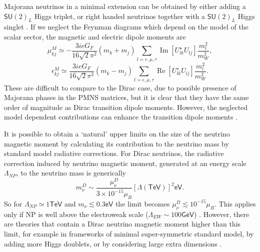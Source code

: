 Majorana neutrinos in a minimal extension can be obtained by either adding a $\textsf{SU}\left(2\right)_L$ Higgs triplet, or right handed neutrinos together with a $\textsf{SU}\left(2\right)_L$ Higgs singlet \cite{nuElmagInt2015.pdf}. If we neglect the Feynman diagrams which depend on the model of the scalar sector, the magnetic and electric dipole moments are
\begin{equation}
\mu_{kj}^M\simeq -\frac{3ieG_F}{16\sqrt{2}\pi^2}\left(m_k+m_j\right)\sum_{l=e,\mu ,\tau}\operatorname{Im}\left[U^{\star}_{lk}U_{lj}\right]\frac{m_l^2}{m_W^2},
\end{equation}
\begin{equation}
\epsilon_{kj}^M\simeq \frac{3ieG_F}{16\sqrt{2}\pi^2}\left(m_k-m_j\right)\sum_{l=e,\mu ,\tau}\operatorname{Re}\left[U^{\star}_{lk}U_{lj}\right]\frac{m_l^2}{m_W^2}.
\end{equation}
These are difficult to compare to the Dirac case, due to possible presence of Majorana phases in the \gls{PMNS} matrices, but it is clear that they have the same order of magnitude as Dirac transition dipole moments. However, the neglected model dependent contributions can enhance the transition dipole moments \cite{nuElmagInt2015.pdf}.

It is possible \cite{nuMMMajoranaBounds2006.pdf} to obtain a `natural' upper limits on the size of the neutrino magnetic moment by calculating its contribution to the neutrino mass by standard model radiative corrections.  For Dirac neutrinos, the radiative correction induced by neutrino magnetic moment, generated at an energy scale $\Lambda_{NP}$, to the neutrino mass is generically
\begin{equation}
m_{\nu}^D\sim\frac{\mu_{\nu}^D}{3\times 10^{-15}\mu_B}\left[\Lambda\left(\textsf{TeV}\right)\right]^2\textsf{eV}.
\end{equation}
So for $\Lambda_{NP}\simeq 1\textsf{TeV}$ and $m_{\nu}\lesssim 0.3\textsf{eV}$ the limit becomes $\mu_{\nu}^D\lesssim 10^{-15}\mu_B$. This applies only if \gls{NP} is well above the electroweak scale ($\Lambda_{EW} \sim 100\textsf{GeV}$) . However, there are theories that contain a Dirac neutrino magnetic moment higher than this limit, for example in frameworks of minimal super-symmetric standard model, by adding more Higgs doublets, or by considering large extra dimensions  \cite{nuElmagInt2015.pdf}.

